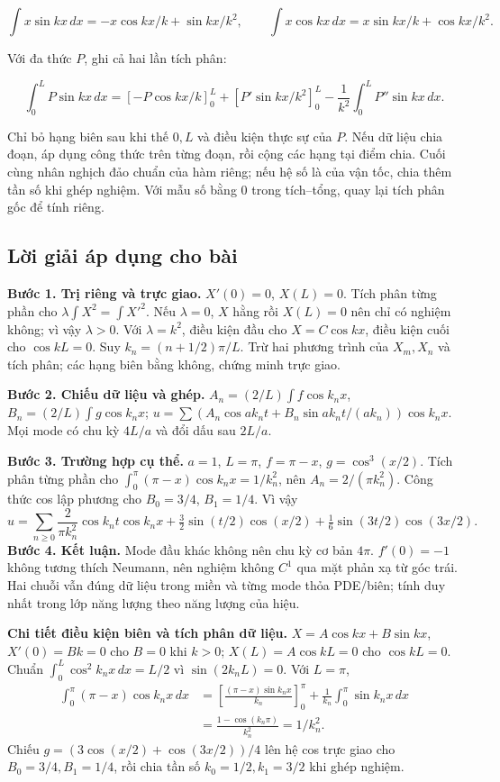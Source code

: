 \documentclass[10pt,a4paper]{article}
\begin{document}
\[
\int x\sin kx\,dx=-x\cos kx/k+\sin kx/k^2,\qquad
\int x\cos kx\,dx=x\sin kx/k+\cos kx/k^2.
\]


Với đa thức $P$, ghi cả hai lần tích phân:


\[
\int_0^L P\sin kx\,dx
=\left[-P\cos kx/k\right]_0^L+
\left[P'\sin kx/k^2\right]_0^L-
\frac1{k^2}\int_0^L P''\sin kx\,dx.
\]


Chỉ bỏ hạng biên sau khi thế $0,L$ và điều kiện thực sự của $P$. Nếu dữ liệu chia đoạn, áp dụng công thức trên từng đoạn, rồi cộng các hạng tại điểm chia. Cuối cùng nhân nghịch đảo chuẩn của hàm riêng; nếu hệ số là của vận tốc, chia thêm tần số khi ghép nghiệm. Với mẫu số bằng $0$ trong tích–tổng, quay lại tích phân gốc để tính riêng.
\subsection*{Lời giải áp dụng cho bài}
\textbf{Bước 1. Trị riêng và trực giao.} $X'(0)=0$, $X(L)=0$. Tích phân từng phần cho $\lambda\int X^2=\int X'^2$. Nếu $\lambda=0$, $X$ hằng rồi $X(L)=0$ nên chỉ có nghiệm không; vì vậy $\lambda>0$. Với $\lambda=k^2$, điều kiện đầu cho $X=C\cos kx$, điều kiện cuối cho $\cos kL=0$. Suy $k_n=(n+1/2)\pi/L$. Trừ hai phương trình của $X_m,X_n$ và tích phân; các hạng biên bằng không, chứng minh trực giao.

\textbf{Bước 2. Chiếu dữ liệu và ghép.} $A_n=(2/L)\int f\cos k_nx$, $B_n=(2/L)\int g\cos k_nx$; $u=\sum(A_n\cos ak_nt+B_n\sin ak_nt/(ak_n))\cos k_nx$. Mọi mode có chu kỳ $4L/a$ và đổi dấu sau $2L/a$.

\textbf{Bước 3. Trường hợp cụ thể.} $a=1$, $L=\pi$, $f=\pi-x$, $g=\cos^3(x/2)$. Tích phân từng phần cho $\int_0^\pi(\pi-x)\cos k_nx=1/k_n^2$, nên $A_n=2/(\pi k_n^2)$. Công thức cos lập phương cho $B_0=3/4$, $B_1=1/4$. Vì vậy
\[u=\sum_{n\ge0}\frac2{\pi k_n^2}\cos k_nt\cos k_nx
+\tfrac32\sin(t/2)\cos(x/2)+\tfrac16\sin(3t/2)\cos(3x/2).\]
\textbf{Bước 4. Kết luận.} Mode đầu khác không nên chu kỳ cơ bản $4\pi$. $f'(0)=-1$ không tương thích Neumann, nên nghiệm không $C^1$ qua mặt phản xạ từ góc trái. Hai chuỗi vẫn đúng dữ liệu trong miền và từng mode thỏa PDE/biên; tính duy nhất trong lớp năng lượng theo năng lượng của hiệu.

\textbf{Chi tiết điều kiện biên và tích phân dữ liệu.} $X=A\cos kx+B\sin kx$, $X'(0)=Bk=0$ cho $B=0$ khi $k>0$; $X(L)=A\cos kL=0$ cho $\cos kL=0$. Chuẩn $\int_0^L\cos^2k_nx\,dx=L/2$ vì $\sin(2k_nL)=0$. Với $L=\pi$,
\[\begin{aligned}
\int_0^\pi(\pi-x)\cos k_nx\,dx
&=\left[\frac{(\pi-x)\sin k_nx}{k_n}\right]_0^\pi
+\frac1{k_n}\int_0^\pi\sin k_nx\,dx\\
&=\frac{1-\cos(k_n\pi)}{k_n^2}=1/k_n^2.
\end{aligned}\]
Chiếu $g=(3\cos(x/2)+\cos(3x/2))/4$ lên hệ cos trực giao cho $B_0=3/4,B_1=1/4$, rồi chia tần số $k_0=1/2,k_1=3/2$ khi ghép nghiệm.
\end{document}
